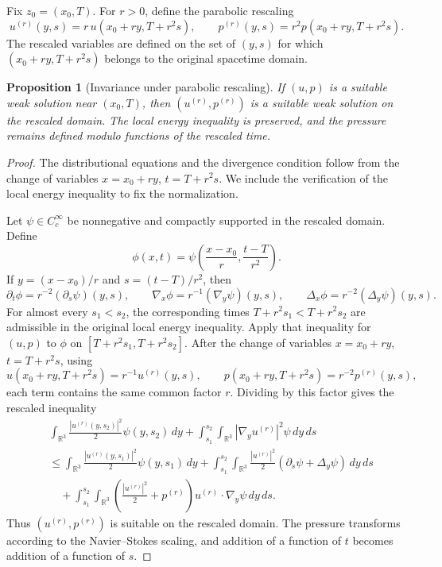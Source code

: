 \documentclass[11pt]{amsart}
\theoremstyle{plain}
\newtheorem{proposition}[proposition]{Proposition}
\theoremstyle{definition}
\theoremstyle{remark}
\begin{document}
Fix \(z_0=(x_0,T)\).  For \(r>0\), define the parabolic rescaling
\[
  u^{(r)}(y,s)=r\,u(x_0+ry,T+r^2s),
  \qquad
  p^{(r)}(y,s)=r^2p(x_0+ry,T+r^2s).
\]
The rescaled variables are defined on the set of \((y,s)\) for which
\((x_0+ry,T+r^2s)\) belongs to the original spacetime domain.

\begin{proposition}[Invariance under parabolic rescaling]
If \((u,p)\) is a suitable weak solution near \((x_0,T)\), then
\((u^{(r)},p^{(r)})\) is a suitable weak solution on the rescaled domain.  The
local energy inequality is preserved, and the pressure remains defined modulo
functions of the rescaled time.
\end{proposition}

\begin{proof}
The distributional equations and the divergence condition follow from the
change of variables \(x=x_0+ry\), \(t=T+r^2s\).  We include the verification of
the local energy inequality to fix the normalization.

Let \(\psi\in C_c^\infty\) be nonnegative and compactly supported in the
rescaled domain.  Define
\[
  \phi(x,t)=
  \psi\left(\frac{x-x_0}{r},\frac{t-T}{r^2}\right).
\]
If \(y=(x-x_0)/r\) and \(s=(t-T)/r^2\), then
\[
  \partial_t\phi=r^{-2}(\partial_s\psi)(y,s),\qquad
  \nabla_x\phi=r^{-1}(\nabla_y\psi)(y,s),\qquad
  \Delta_x\phi=r^{-2}(\Delta_y\psi)(y,s).
\]
For almost every \(s_1<s_2\), the corresponding times
\(T+r^2s_1<T+r^2s_2\) are admissible in the original local energy inequality.
Apply that inequality for \((u,p)\) to \(\phi\) on
\([T+r^2s_1,T+r^2s_2]\).  After the change of variables
\(x=x_0+ry\), \(t=T+r^2s\), using
\[
  u(x_0+ry,T+r^2s)=r^{-1}u^{(r)}(y,s),\qquad
  p(x_0+ry,T+r^2s)=r^{-2}p^{(r)}(y,s),
\]
each term contains the same common factor \(r\).  Dividing by this factor gives
the rescaled inequality
\[
\begin{aligned}
&\int_{\mathbb R^3}\frac{|u^{(r)}(y,s_2)|^2}{2}\psi(y,s_2)\,dy
 +\int_{s_1}^{s_2}\int_{\mathbb R^3}|\nabla_y u^{(r)}|^2\psi\,dy\,ds \\
&\le
 \int_{\mathbb R^3}\frac{|u^{(r)}(y,s_1)|^2}{2}\psi(y,s_1)\,dy
 +\int_{s_1}^{s_2}\int_{\mathbb R^3}
   \frac{|u^{(r)}|^2}{2}(\partial_s\psi+\Delta_y\psi)\,dy\,ds \\
&\quad
 +\int_{s_1}^{s_2}\int_{\mathbb R^3}
   \left(\frac{|u^{(r)}|^2}{2}+p^{(r)}\right)
   u^{(r)}\cdot\nabla_y\psi\,dy\,ds .
\end{aligned}
\]
Thus \((u^{(r)},p^{(r)})\) is suitable on the rescaled domain.  The pressure
transforms according to the Navier--Stokes scaling, and addition of a function
of \(t\) becomes addition of a function of \(s\).
\end{proof}
\end{document}
